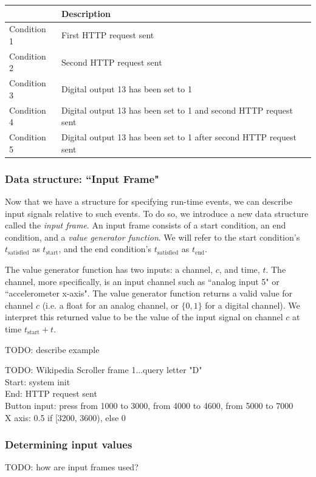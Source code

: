 \documentclass[12pt]{article}
\begin{document}
\begin{table}
\begin{center}
\begin{tabular}{l|l}
& Description \\ \hline
Condition 1 & First HTTP request sent \\
Condition 2 & Second HTTP request sent \\
Condition 3 & Digital output 13 has been set to 1 \\
Condition 4 & Digital output 13 has been set to 1 and second HTTP request sent \\
Condition 5 & Digital output 13 has been set to 1 after second HTTP request sent \\ \hline
\end{tabular}
\end{center}
\end{table}

\subsubsection{Data structure: ``Input Frame"}
Now that we have a structure for specifying run-time events, we can describe input signals relative to such events.  To do so, we introduce a new data structure called the \textit{input frame}.  An input frame consists of a start condition, an end condition, and a \textit{value generator function}.  We will refer to the start condition's $t_{\text{satisfied}}$ as $t_{\text{start}}$, and the end condition's $t_{\text{satisfied}}$ as $t_{\text{end}}$.

The value generator function has two inputs: a channel, $c$, and time, $t$.  The channel, more specifically, is an input channel such as ``analog input 5" or ``accelerometer x-axis".  The value generator function returns a valid value for channel $c$ (i.e. a float for an analog channel, or $\{0,1\}$ for a digital channel).  We interpret this returned value to be the value of the input signal on channel $c$ at time $t_{\text{start}}+t$.

TODO: describe example

\noindent TODO: Wikipedia Scroller frame 1...query letter "D" \\
Start: system init \\
End: HTTP request sent \\
Button input: press from 1000 to 3000,  from 4000 to 4600, from 5000 to 7000 \\
X axis: 0.5 if [3200, 3600), else 0 \\

\subsubsection{Determining input values}
TODO: how are input frames used?
\end{document}
